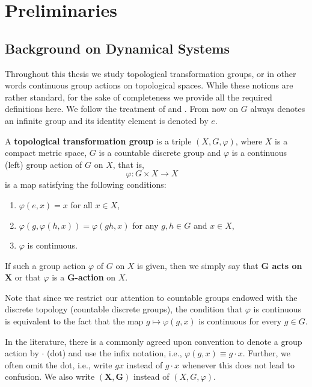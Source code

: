 \chapter{Preliminaries}

\section{Background on Dynamical Systems}

Throughout this thesis we study topological transformation groups, or in other words continuous group actions on topological spaces.
%
While these notions are rather standard, for the sake of completeness we provide all the required definitions here. We follow the treatment of \cite{deVries93} and \cite{GH55}. 
% 
From now on $G$ always denotes an infinite group and its identity element is denoted by $e$.

\begin{defn}\label{def:dynamical_system}
A {\bf topological transformation group} is a triple $(X,G,\varphi)$, where $X$ is a compact metric space, $G$ is a countable discrete group and $\varphi$ is a continuous (left) group action of $G$ on $X$, that is,
\[
\varphi\colon G\times X \to X \quad 
\]
is a map satisfying the following conditions:
\begin{enumerate}
\item $\varphi(e,x)=x$ for all $x\in X$, 
\item $\varphi(g,\varphi(h,x))=\varphi(gh,x)$ for any $g,h\in G$ and $x\in X$,
\item $\varphi$ is continuous.
\end{enumerate}
If such a group action $\varphi$ of $G$ on $X$ is given, then we simply say that {\bf $\bm{G}$ acts on $\bm{X}$} or that $\varphi$ is a $\bm{G}${\bf-action} on $X$.
\end{defn}
\noindent

Note that since we restrict our attention to countable groups endowed with the discrete topology (countable discrete groups), the condition that $\varphi$ is continuous is equivalent to the fact that the map $g\mapsto \varphi(g,x)$ is continuous for every $g\in G$.



In the literature, there is a commonly agreed upon convention to denote a group action by $\cdot$ (dot) and use the infix notation, i.e., $\varphi(g,x) \equiv g\cdot x$.
%
Further, we often omit the dot, i.e., write $gx$ instead of $g\cdot x$ whenever this does not lead to confusion.
%
We also write $\bm{(X,G)}$ instead of $(X,G,\varphi)$.
%

